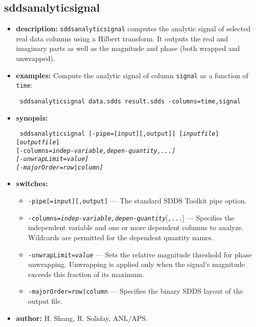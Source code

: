 \newpage
\subsection{sddsanalyticsignal}
\label{sddsanalyticsignal}

\begin{itemize}
\item {\bf description:}
{\tt sddsanalyticsignal} computes the analytic signal of selected real data columns
using a Hilbert transform.  It outputs the real and imaginary parts as well as
the magnitude and phase (both wrapped and unwrapped).
\item {\bf examples:}
Compute the analytic signal of column {\tt signal} as a function of {\tt time}:
\begin{flushleft}{\tt
sddsanalyticsignal data.sdds result.sdds -columns=time,signal
}\end{flushleft}
\item {\bf synopsis:}
  \begin{flushleft}{\tt
  sddsanalyticsignal {}[-pipe=[input][,output]] [{\em inputfile}] [{\em outputfile}] \\
    {}[-columns=\em indep-variable,\em depen-quantity\lbrack,...\rbrack] \\
    {}[-unwrapLimit=\em value] \\
    {}[-majorOrder=row|column]
  }\end{flushleft}
\item {\bf switches:}
    \begin{itemize}
    \item \verb|-pipe[=input][,output]| --- The standard SDDS Toolkit pipe option.
    \item {\tt -columns=\em indep-variable,\em depen-quantity}[{\tt ,...}] ---
    Specifies the independent variable and one or more dependent columns to
    analyze.  Wildcards are permitted for the dependent quantity names.
    \item {\tt -unwrapLimit=\em value} --- Sets the relative magnitude threshold
    for phase unwrapping.  Unwrapping is applied only when the signal's
    magnitude exceeds this fraction of its maximum.
    \item {\tt -majorOrder=row|column} --- Specifies the binary SDDS layout of
    the output file.
    \end{itemize}
\item {\bf author:} H. Shang, R. Soliday, ANL/APS.
\end{itemize}
